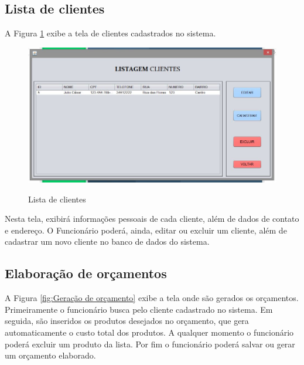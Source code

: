         
\subsection{Lista de clientes}

A Figura \ref{fig:Lista de clientes} exibe a tela de clientes cadastrados no sistema. 
        
 \begin{figure}[H]
\centering
\caption{Lista de clientes}
\includegraphics[width=14cm]{imagens/telas/ListaCliente}
\label{fig:Lista de clientes}
\end{figure}
        
Nesta tela, exibirá informações pessoais de cada cliente, além de dados de contato e endereço. O Funcionário poderá, ainda, editar ou excluir um cliente, além de cadastrar um novo cliente no banco de dados do sistema.    
        
\subsection{Elaboração de orçamentos}
A Figura \ref{fig:Geração de orçamento} exibe a tela onde são gerados os orçamentos. Primeiramente o funcionário  busca pelo cliente cadastrado no sistema. Em seguida, são inseridos os produtos desejados no orçamento, que gera automaticamente o custo total dos produtos. A qualquer momento o funcionário poderá excluir um produto da lista. Por fim o funcionário poderá salvar ou gerar um orçamento elaborado.

